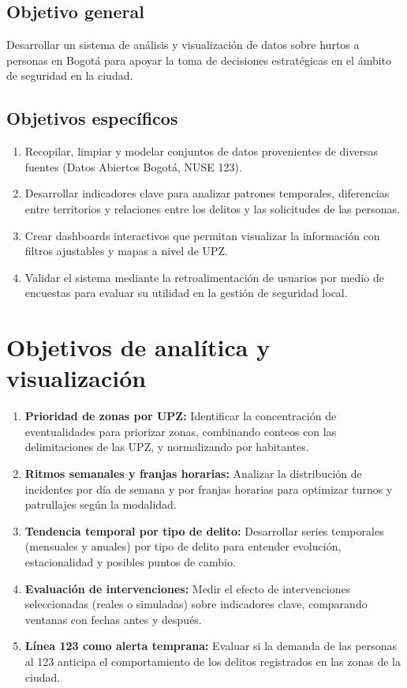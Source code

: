 \documentclass[12pt,letterpaper]{article}
\begin{document}
\subsection{Objetivo general}

Desarrollar un sistema de análisis y visualización de datos sobre hurtos a personas en Bogotá para apoyar la toma de decisiones estratégicas en el ámbito de seguridad en la ciudad.

\subsection{Objetivos específicos}

\begin{enumerate}
    \item Recopilar, limpiar y modelar conjuntos de datos provenientes de diversas fuentes (Datos Abiertos Bogotá, NUSE 123).
    \item Desarrollar indicadores clave para analizar patrones temporales, diferencias entre territorios y relaciones entre los delitos y las solicitudes de las personas.
    \item Crear dashboards interactivos que permitan visualizar la información con filtros ajustables y mapas a nivel de UPZ.
    \item Validar el sistema mediante la retroalimentación de usuarios por medio de encuestas para evaluar su utilidad en la gestión de seguridad local.
\end{enumerate}

\section{Objetivos de analítica y visualización}

\begin{enumerate}
    \item \textbf{Prioridad de zonas por UPZ:} Identificar la concentración de eventualidades para priorizar zonas, combinando conteos con las delimitaciones de las UPZ, y normalizando por habitantes.
    \item \textbf{Ritmos semanales y franjas horarias:} Analizar la distribución de incidentes por día de semana y por franjas horarias para optimizar turnos y patrullajes según la modalidad.
    \item \textbf{Tendencia temporal por tipo de delito:} Desarrollar series temporales (mensuales y anuales) por tipo de delito para entender evolución, estacionalidad y posibles puntos de cambio.
    \item \textbf{Evaluación de intervenciones:} Medir el efecto de intervenciones seleccionadas (reales o simuladas) sobre indicadores clave, comparando ventanas con fechas antes y después.
    \item \textbf{Línea 123 como alerta temprana:} Evaluar si la demanda de las personas al 123 anticipa el comportamiento de los delitos registrados en las zonas de la ciudad.
\end{enumerate}
\end{document}
